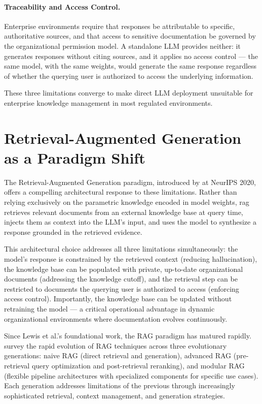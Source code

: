 \paragraph{Traceability and Access Control.} Enterprise environments require that responses be attributable to specific, authoritative sources, and that access to sensitive documentation be governed by the organizational permission model. A standalone LLM provides neither: it generates responses without citing sources, and it applies no access control — the same model, with the same weights, would generate the same response regardless of whether the querying user is authorized to access the underlying information.

These three limitations converge to make direct LLM deployment unsuitable for enterprise knowledge management in most regulated environments.

\section{Retrieval-Augmented Generation as a Paradigm Shift}
\label{sec:intro-rag}

The Retrieval-Augmented Generation paradigm, introduced by \citet{Lewis2020} at NeurIPS 2020, offers a compelling architectural response to these limitations. Rather than relying exclusively on the parametric knowledge encoded in model weights, \gls{rag} retrieves relevant documents from an external knowledge base at query time, injects them as context into the LLM's input, and uses the model to synthesize a response grounded in the retrieved evidence.

This architectural choice addresses all three limitations simultaneously: the model's response is constrained by the retrieved context (reducing hallucination), the knowledge base can be populated with private, up-to-date organizational documents (addressing the knowledge cutoff), and the retrieval step can be restricted to documents the querying user is authorized to access (enforcing access control). Importantly, the knowledge base can be updated without retraining the model — a critical operational advantage in dynamic organizational environments where documentation evolves continuously.

Since Lewis et al.'s foundational work, the RAG paradigm has matured rapidly. \citet{Gao2024} survey the rapid evolution of RAG techniques across three evolutionary generations: naive RAG (direct retrieval and generation), advanced RAG (pre-retrieval query optimization and post-retrieval reranking), and modular RAG (flexible pipeline architectures with specialized components for specific use cases). Each generation addresses limitations of the previous through increasingly sophisticated retrieval, context management, and generation strategies.

